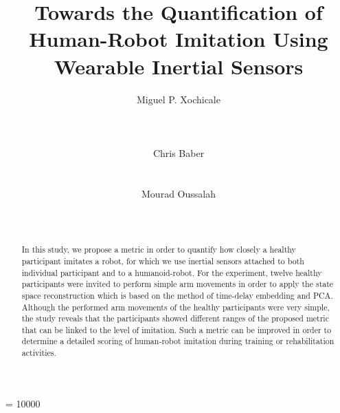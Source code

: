 \documentclass{sig-alternate-05-2015}
\begin{document}




\widowpenalty = 10000



\title{Towards the Quantification of Human-Robot Imitation Using Wearable Inertial Sensors}


\author{
\alignauthor Miguel P. Xochicale\\
      \\
        \\
         \\
\alignauthor Chris Baber\\
        \\
         \\
\alignauthor Mourad Oussalah\\
        \\
         \\
}
 



\maketitle
\begin{abstract}
In this study, we propose a metric in order to quantify how closely a healthy participant imitates a robot,
for which we use inertial sensors attached to both individual participant and to a humanoid-robot.
For the experiment, twelve healthy participants were invited to perform 
simple arm movements in order to apply
the state space reconstruction which 
is based on the method of time-delay embedding and PCA.
Although the performed arm movements of the healthy participants were very simple,
the study reveals that the participants showed different ranges of the proposed metric 
that can be linked to the level of imitation.
Such a metric can be improved in order to determine
a detailed scoring of human-robot imitation
during training or rehabilitation activities.
\end{abstract}
\end{document}
